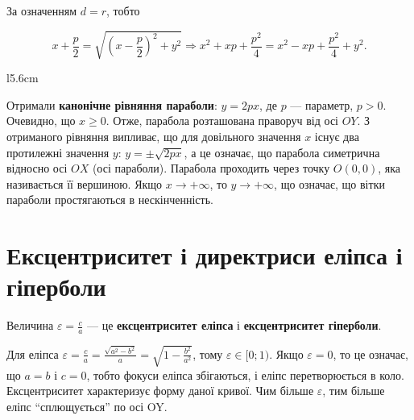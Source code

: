 За означенням $d = r$, тобто

$$x + \frac{p}{2} = \sqrt{(x-\frac{p}{2})^2 + y^2} \Rightarrow x ^2 + xp + \frac{p^2}{4} = x^2 - xp + \frac{p^2}{4} + y^2.$$

\begin{wrapfigure}{l}{5.6cm}\end{wrapfigure}

Отримали \textbf{канонічне рівняння
параболи}: $y =2px$, де $p$ ---
параметр, $p > 0$.
Очевидно, що $x \geqslant 0 $. Отже,
парабола розташована праворуч від
осі $OY$. З отриманого рівняння
випливає, що для довільного значення
$x$ існує два протилежні значення $y$:
$y = \pm\sqrt{2px}$, а це означає, що
парабола симетрична відносно осі $OX$ (осі параболи). Парабола проходить через
точку $O(0,0)$, яка називається її вершиною. Якщо $x \rightarrow +\infty$, то $y \rightarrow +\infty$, що
означає, що вітки параболи простягаються в нескінченність. 

\section{Ексцентриситет і директриси еліпса і гіперболи}

\begin{definition}
	Величина $\varepsilon = \frac{c}{a}$ --- це \textbf{ексцентриситет еліпса} і \textbf{ексцентриситет гіперболи}.
\end{definition}

Для еліпса $\varepsilon = \frac{c}{a} = \frac{\sqrt{a^2 - b^2}}{a} = \sqrt{1-\frac{b^2}{a^2}}$,
тому $\varepsilon \in [0;1)$. Якщо $\varepsilon = 0$, то це
означає, що $a=b$ і $c=0$, тобто фокуси еліпса збігаються, і еліпс перетворюється
в коло. Ексцентриситет характеризує форму даної кривої. Чим більше $\varepsilon$, тим
більше еліпс “сплющується” по осі OY.

